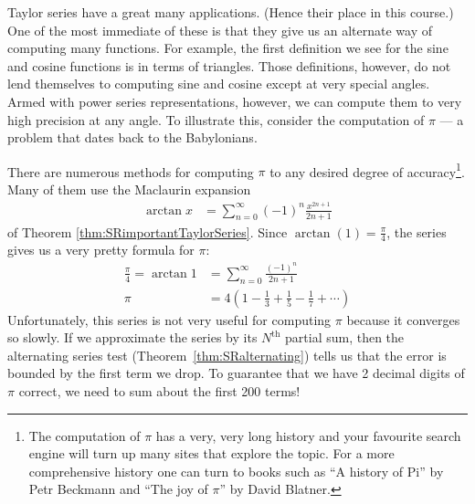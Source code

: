 Taylor series have a great many applications. (Hence their place in this
course.) One of the most immediate of these is that they give us an
alternate way of computing many functions. For example, the first
definition we see for the sine and cosine functions is in terms of
triangles. Those definitions, however, do not lend themselves to
computing sine and cosine except at very special angles. Armed with
power series representations, however, we can compute
them to very high precision at any angle. To illustrate this, consider the
computation of $\pi$ --- a problem that dates back to the Babylonians.

\begin{eg}\label{eg:pi}
There are numerous methods for computing $\pi$ to any desired degree
of accuracy\footnote{The computation of $\pi$ has a very, very long
history and your favourite search engine will turn
up many sites that explore the topic. For a more comprehensive
history one can turn to books such as ``A history of
Pi'' by Petr Beckmann and ``The joy of $\pi$'' by David Blatner.}. Many
of them use the Maclaurin expansion
\begin{align*}
\arctan x &= \sum_{n=0}^\infty (-1)^n\frac{x^{2n+1}}{2n+1}
\end{align*}
of Theorem \ref{thm:SRimportantTaylorSeries}.
Since $\arctan(1)=\frac{\pi}{4}$, the series gives us a very pretty
formula for $\pi$:
\begin{align*}
\frac{\pi}{4} = \arctan 1 &= \sum_{n=0}^\infty \frac{(-1)^n}{2n+1}\\
 \pi &= 4 \left( 1 - \frac{1}{3} + \frac{1}{5} - \frac{1}{7} + \cdots \right)
\end{align*}
Unfortunately, this series is not very useful for computing $\pi$ because it converges so slowly. If we approximate the
series by its $N^\mathrm{th}$ partial sum, then the alternating series test (Theorem~\ref{thm:SRalternating}) tells us
that the error is bounded by the first term we drop. To guarantee
that we have 2 decimal digits of $\pi$ correct, we need to
sum about the first 200 terms!


\end{eg}
